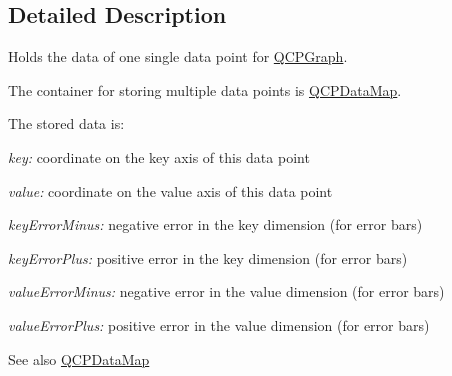 \subsection{\-Detailed \-Description}
\-Holds the data of one single data point for \hyperlink{classQCPGraph}{\-Q\-C\-P\-Graph}. 

\-The container for storing multiple data points is \hyperlink{qcustomplot_8h_a84a9c4a4c2216ccfdcb5f3067cda76e3}{\-Q\-C\-P\-Data\-Map}.

\-The stored data is\-: \begin{DoxyItemize}
\item {\itshape key\-:\/} coordinate on the key axis of this data point \item {\itshape value\-:\/} coordinate on the value axis of this data point \item {\itshape key\-Error\-Minus\-:\/} negative error in the key dimension (for error bars) \item {\itshape key\-Error\-Plus\-:\/} positive error in the key dimension (for error bars) \item {\itshape value\-Error\-Minus\-:\/} negative error in the value dimension (for error bars) \item {\itshape value\-Error\-Plus\-:\/} positive error in the value dimension (for error bars)\end{DoxyItemize}
\begin{DoxySeeAlso}{\-See also}
\hyperlink{qcustomplot_8h_a84a9c4a4c2216ccfdcb5f3067cda76e3}{\-Q\-C\-P\-Data\-Map} 
\end{DoxySeeAlso}


